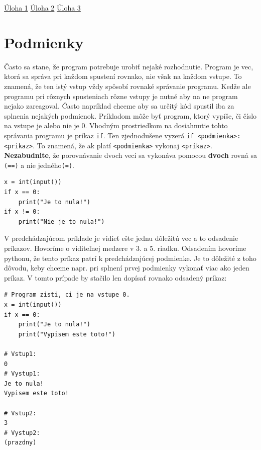 \documentclass{article}
\begin{document}
\href{https://testovac.ksp.sk/tasks/ls-uvod-cislo/}{Úloha 1}
\href{https://testovac.ksp.sk/tasks/ls-uvod-zamena/}{Úloha 2}
\href{https://testovac.ksp.sk/tasks/ls-uvod-obdlznik1/}{Úloha 3}

\section{Podmienky}

Často sa stane, že program potrebuje urobiť nejaké rozhodnutie. Program je vec, ktorá sa správa pri každom spustení rovnako, nie však na každom vstupe. To znamená, že ten istý vstup vždy spôsobí rovnaké správanie programu. Kedže ale programu pri rôznych spusteniach rôzne vstupy je nutné aby na ne program nejako zareagoval. Často napríklad chceme aby sa určitý kód spustil iba za splnenia nejakých podmienok. Príkladom môže byť program, ktorý vypíše, či číslo na vstupe je alebo nie je 0. Vhodným prostriedkom na dosiahnutie tohto správania programu je príkaz \texttt{if}. Ten
zjednodušene vyzerá \texttt{if <podmienka>: <prikaz>}. To znamená, že ak platí \texttt{<podmienka>}
vykonaj \texttt{<príkaz>}. \textbf{Nezabudnite}, že porovnávanie dvoch vecí sa vykonáva pomocou
\textbf{dvoch} rovná sa \texttt{(==)} a nie jedného\texttt{(=)}.

\begin{lstlisting}
x = int(input())
if x == 0:
    print("Je to nula!")
if x != 0:
    print("Nie je to nula!")
\end{lstlisting}

V predchádzajúcom príklade je vidieť ešte jednu dôležitú vec a to odsadenie príkazov. Hovoríme o viditeľnej medzere v 3. a 5. riadku. Odsadením hovoríme pythonu, že tento príkaz patrí k predchádzajúcej podmienke. Je to dôležité z toho dôvodu, keby chceme napr. pri splnení prvej podmienky vykonať viac ako jeden príkaz. V tomto prípade by stačilo len dopísať rovnako odsadený príkaz:


\begin{lstlisting}
# Program zisti, ci je na vstupe 0.
x = int(input())
if x == 0:
    print("Je to nula!")
    print("Vypisem este toto!")
    
# Vstup1:
0
# Vystup1:
Je to nula!
Vypisem este toto!

# Vstup2:
3
# Vystup2:
(prazdny)
\end{lstlisting}
\end{document}
